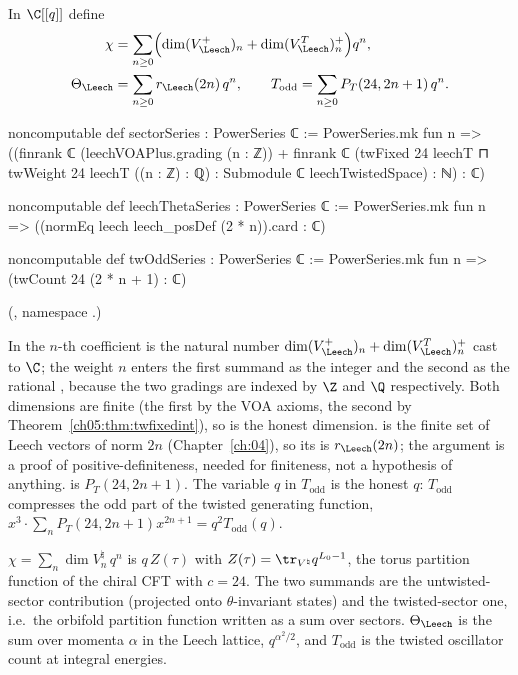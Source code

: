\begin{definition}\label{ch05:def:sector}
In $\C[[q]]$ define
\begin{align*}
  \chi &= \sum_{n\ge0}\Bigl(\dim(V_\Leech^+)_n + \dim(V_\Leech^T)^+_n\Bigr)q^n,\\
  \Theta_\Leech &= \sum_{n\ge0} r_\Leech(2n)\,q^n,\qquad
  T_{\mathrm{odd}} = \sum_{n\ge0}P_T(24,2n+1)\,q^n .
\end{align*}
\end{definition}
\begin{leancode}
noncomputable def sectorSeries : PowerSeries ℂ :=
  PowerSeries.mk fun n =>
    ((finrank ℂ (leechVOAPlus.grading (n : ℤ))
      + finrank ℂ (twFixed 24 leechT ⊓ twWeight 24 leechT ((n : ℤ) : ℚ) :
          Submodule ℂ leechTwistedSpace) : ℕ) : ℂ)

noncomputable def leechThetaSeries : PowerSeries ℂ :=
  PowerSeries.mk fun n => ((normEq leech leech_posDef (2 * n)).card : ℂ)

noncomputable def twOddSeries : PowerSeries ℂ :=
  PowerSeries.mk fun n => (twCount 24 (2 * n + 1) : ℂ)
\end{leancode}
(, namespace .)
\begin{dictionary}
In  the $n$-th coefficient is the natural number $\dim(V_\Leech^+)_n +
\dim(V_\Leech^T)^+_n$ cast to $\C$; the weight $n$ enters the first summand as the integer  and the second as the rational , because the two gradings are indexed by $\Z$
and $\Q$ respectively. Both dimensions are finite (the first by the VOA axioms, the second by
Theorem~\ref{ch05:thm:twfixedint}), so  is the honest dimension.  is the finite set of Leech vectors of norm $2n$ (Chapter~\ref{ch:04}), so its
 is $r_\Leech(2n)$; the argument  is a proof of positive-definiteness,
needed for finiteness, not a hypothesis of anything.  is $P_T(24,2n+1)$. The
variable $q$ in $T_{\mathrm{odd}}$ is the honest $q$: $T_{\mathrm{odd}}$ compresses the odd part of the
twisted generating function, $x^3\cdot\sum_n P_T(24,2n+1)x^{2n+1} = q^2T_{\mathrm{odd}}(q)$.
\end{dictionary}

\begin{physics}
$\chi=\sum_n\dim V^\natural_n\,q^n$ is $q\,Z(\tau)$ with $Z(\tau)=\tr_{V^\natural}q^{L_0-1}$, the torus partition function of the chiral CFT with $c=24$. The two summands are the untwisted-sector contribution (projected onto $\theta$-invariant states) and the twisted-sector one, i.e.\ the orbifold partition function written as a sum over sectors. $\Theta_\Leech$ is the sum over momenta $\alpha$ in the Leech lattice, $q^{\alpha^2/2}$, and $T_{\mathrm{odd}}$ is the twisted oscillator count at integral energies.
\end{physics}

